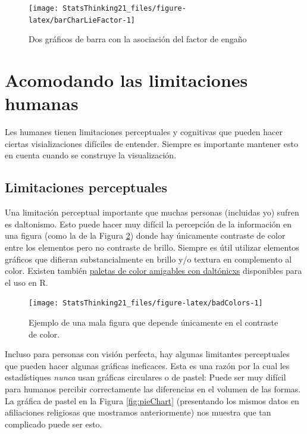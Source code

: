 \documentclass[
  12pt,
]{book}
\theoremstyle{definition}
\theoremstyle{definition}
\theoremstyle{definition}
\theoremstyle{remark}
\begin{document}
\begin{figure}
\texttt{[image: StatsThinking21\_files/figure-latex/barCharLieFactor-1]} \caption{Dos gráficos de barra con la asociación del factor de engaño }\label{fig:barCharLieFactor}
\end{figure}

\hypertarget{acomodando-las-limitaciones-humanas}{%
\section{Acomodando las limitaciones humanas}\label{acomodando-las-limitaciones-humanas}}

Les humanes tienen limitaciones perceptuales y cognitivas que pueden hacer ciertas visializaciones difíciles de entender. Siempre es importante mantener esto en cuenta cuando se construye la visualización.

\hypertarget{limitaciones-perceptuales}{%
\subsection{Limitaciones perceptuales}\label{limitaciones-perceptuales}}

Una limitación perceptual importante que muchas personas (incluidas yo) sufren es daltonismo. Esto puede hacer muy difícil la percepción de la información en una figura (como la de la Figura \ref{fig:badColors}) donde hay únicamente contraste de color entre los elementos pero no contraste de brillo. Siempre es útil utilizar elementos gráficos que difieran substancialmente en brillo y/o textura en complemento al color. Existen también \href{http://www.cookbook-r.com/Graphs/Colors_(ggplot2)/\#a-colorblind-friendly-palette}{paletas de color amigables con daltónicxs} disponibles para el uso en R.

\begin{figure}
\texttt{[image: StatsThinking21\_files/figure-latex/badColors-1]} \caption{Ejemplo de una mala figura que depende únicamente en el contraste de color.}\label{fig:badColors}
\end{figure}

Incluso para personas con visión perfecta, hay algunas limitantes perceptuales que pueden hacer algunas gráficas ineficaces. Esta es una razón por la cual les estadístiques \emph{nunca} usan gráficas circulares o de pastel: Puede ser muy difícil para humanos percibir correctamente las diferencias en el volumen de las formas. La gráfica de pastel en la Figura \ref{fig:pieChart} (presentando los mismos datos en afiliaciones religiosas que mostramos anteriormente) nos muestra que tan complicado puede ser esto.
\end{document}
